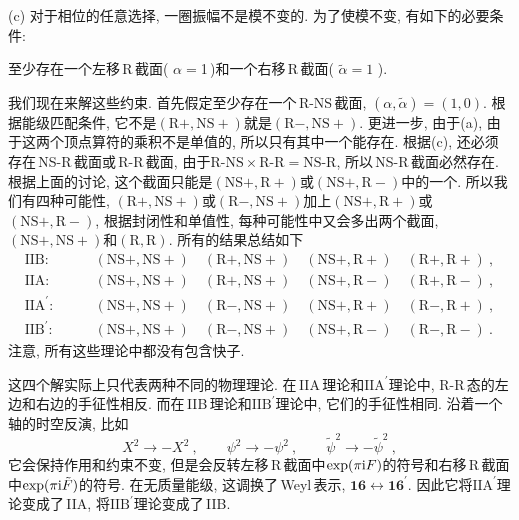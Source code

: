 \noindent (c) 对于相位的任意选择, 一圈振幅不是模不变的. 为了使模不变, 有如下的必要条件:

\noindent \quad\: 至少存在一个左移\,R\,截面( $\alpha=$1\,)和一个右移\,R\,截面( $\tilde{\alpha}=1$ ).

我们现在来解这些约束. 首先假定至少存在一个\,R-NS\,截面, $(\alpha,\tilde{\alpha})=(1,0)$. 根据能级匹配条件, 它不是$(\text{R}+,\text{NS}+)$就是$(\text{R}-,\text{NS}+)$. 更进一步, 由于(a), 由于这两个顶点算符的乘积不是单值的, 所以只有其中一个能存在. 根据(c), 还必须存在\,NS-R\,截面或\,R-R\,截面, 由于$ \text{R-NS}\times \text{R-R}=\text{NS-R}$, 所以\,NS-R\,截面必然存在. 根据上面的讨论, 这个截面只能是$(\text{NS}+,\text{R}+)$或$(\text{NS}+,\text{R}-)$中的一个. 所以我们有四种可能性,  $(\text{R}+,\text{NS}+)$或$(\text{R}-,\text{NS}+)$加上$(\text{NS}+,\text{R}+)$或$(\text{NS}+,\text{R}-)$, 根据封闭性和单值性, 每种可能性中又会多出两个截面, $(\text{NS}+,\text{NS}+)$和$(\text{R},\text{R})$. 所有的结果总结如下
\begin{align*}
    \text{IIB}:&\qquad (\text{NS}+,\text{NS}+)\quad (\text{R}+,\text{NS}+)\quad (\text{NS}+,\text{R}+)\quad (\text{R}+,\text{R}+) \:, \\
    \text{IIA}:&\qquad (\text{NS}+,\text{NS}+)\quad (\text{R}+,\text{NS}+)\quad (\text{NS}+,\text{R}-)\quad (\text{R}+,\text{R}-) \:, \\
    \text{IIA}^{\prime}:&\qquad (\text{NS}+,\text{NS}+)\quad (\text{R}-,\text{NS}+)\quad (\text{NS}+,\text{R}+)\quad (\text{R}-,\text{R}+) \:, \\
    \text{IIB}^{\prime}:& \qquad (\text{NS}+,\text{NS}+)\quad (\text{R}-,\text{NS}+)\quad (\text{NS}+,\text{R}-)\quad (\text{R}-,\text{R}-) \:. 
\end{align*}
注意, 所有这些理论中都没有包含快子.

这四个解实际上只代表两种不同的物理理论. 在\,IIA\,理论和$ \text{IIA}^{\prime} $理论中, R-R\,态的左边和右边的手征性相反. 而在\,IIB\,理论和$ \text{IIB}^{\prime} $理论中, 它们的手征性相同. 沿着一个轴的时空反演, 比如
\begin{equation}
    X^{2}\to-X^{2}\:,\qquad \psi^{2}\to -\psi^{2} \:, \qquad \tilde{\psi}^{2}\to -\tilde{\psi}^{2} \:,\label{10.6.7} 
\end{equation}
它会保持作用和约束不变, 但是会反转左移\,R\,截面中$ \exp(\pi\mathrm{i} F) $的符号和右移\,R\,截面中$ \exp(\pi\mathrm{i} \tilde{F}) $的符号. 在无质量能级, 这调换了\,Weyl\,表示, $\mathbf{16}\leftrightarrow \mathbf{16}^{\prime}$. 因此它将$ \text{IIA}^{\prime} $理论变成了\,IIA, 将$ \text{IIB}^{\prime} $理论变成了\,IIB.

